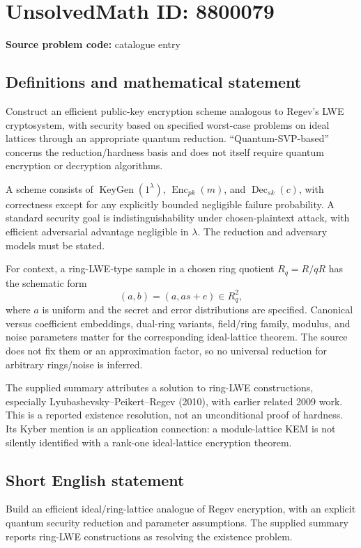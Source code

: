 \documentclass[11pt]{article}
\begin{document}
\section*{UnsolvedMath ID: 8800079}
\textbf{Source problem code:} catalogue entry
\subsection{Definitions and mathematical statement}
Construct an efficient public-key encryption scheme analogous to Regev's LWE cryptosystem, with security based on specified worst-case problems on ideal lattices through an appropriate quantum reduction. ``Quantum-SVP-based'' concerns the reduction/hardness basis and does not itself require quantum encryption or decryption algorithms.

A scheme consists of $\operatorname{KeyGen}(1^\lambda)$, $\operatorname{Enc}_{pk}(m)$, and $\operatorname{Dec}_{sk}(c)$, with correctness except for any explicitly bounded negligible failure probability. A standard security goal is indistinguishability under chosen-plaintext attack, with efficient adversarial advantage negligible in $\lambda$. The reduction and adversary models must be stated.

For context, a ring-LWE-type sample in a chosen ring quotient $R_q=R/qR$ has the schematic form
\[
(a,b)=(a,as+e)\in R_q^2,
\]
where $a$ is uniform and the secret and error distributions are specified. Canonical versus coefficient embeddings, dual-ring variants, field/ring family, modulus, and noise parameters matter for the corresponding ideal-lattice theorem. The source does not fix them or an approximation factor, so no universal reduction for arbitrary rings/noise is inferred.

The supplied summary attributes a solution to ring-LWE constructions, especially Lyubashevsky--Peikert--Regev (2010), with earlier related 2009 work. This is a reported existence resolution, not an unconditional proof of hardness. Its Kyber mention is an application connection: a module-lattice KEM is not silently identified with a rank-one ideal-lattice encryption theorem.
\subsection{Short English statement}
Build an efficient ideal/ring-lattice analogue of Regev encryption, with an explicit quantum security reduction and parameter assumptions. The supplied summary reports ring-LWE constructions as resolving the existence problem.
\end{document}
